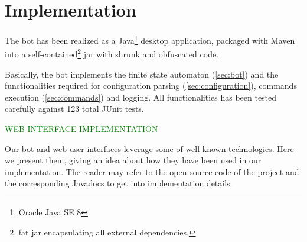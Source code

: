 \section{Implementation}
\label{sec:implementation}

The bot has been realized as a Java\footnote{Oracle Java SE 8} desktop application, packaged with Maven into a self-contained\footnote{fat jar encapsulating all external dependencies.} jar with shrunk and obfuscated code.

Basically, the bot implements the finite state automaton (\ref{sec:bot}) and the functionalities required for configuration parsing (\ref{sec:configuration}), commands execution (\ref{sec:commands}) and logging. All functionalities has been tested carefully against 123 total JUnit tests.

\textcolor{green}{WEB INTERFACE IMPLEMENTATION \lipsum[1]}

Our bot and web user interfaces leverage some of well known technologies. Here we present them, giving an idea about how they have been used in our implementation. The reader may refer to the open source code of the project and the corresponding Javadocs to get into implementation details.


